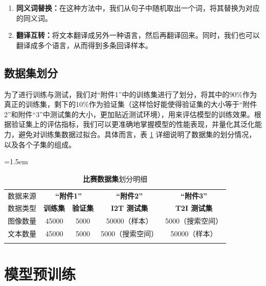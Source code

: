 \documentclass[a4paper]{zreport}
\begin{document}
{{{\begin{enumerate}
\item \textbf{同义词替换：}在这种方法中，我们从句子中随机取出一个词，将其替换为对应的同义词。
\item \textbf{翻译互转：}将文本翻译成另外一种语言，然后再翻译回来。同时，我们也可以翻译成多个语言，从而得到多条回译样本。
\end{enumerate}

\subsection{数据集划分}

为了进行训练与测试，我们对“附件1”中的训练集进行了划分，将其中的90\%作为真正的训练集，剩下的10\%作为验证集（这样恰好能使得验证集的大小等于“附件2”和附件“3”中测试集的大小，更加贴近测试环境），用来评估模型的训练效果。根据验证集上的评估指标，我们可以更准确地掌握模型的性能表现，并量化其泛化能力，避免对训练集数据过拟合。具体而言，表 \ref{tbl:DataSplit} 详细说明了数据集的划分情况，以及各个子集的组成。

\begin{table}[h]
\centering
\tabcolsep=1.5em
\renewcommand\arraystretch{1.5}
\caption{\textbf{比赛数据集}划分明细}
\vspace{1em}
\begin{tabular}{c|c|c|c|c}
    \Xhline{2pt}
    数据来源 & \multicolumn{2}{c|}{\textbf{“附件1”}} & \multicolumn{1}{c|}{\textbf{“附件2”}} & 
    \multicolumn{1}{c}{\textbf{“附件3”}}\\
    
    \Xhline{1.5pt}

    数据类型 & \textbf{训练集} & \textbf{验证集} & \textbf{I2T 测试集} & \textbf{T2I 测试集} \\
    \Xhline{0.4pt}
    图像数量 & {45000} & {5000} & {50000（样本）} & {5000（搜索空间）} \\
    \Xhline{0.4pt}
    文本数量 & {45000} & {5000} & {5000（搜索空间）} & {50000（样本）} \\

    \Xhline{2pt}
\end{tabular} \label{tbl:DataSplit}
\end{table}


\section{模型预训练}

}}}
\end{document}
